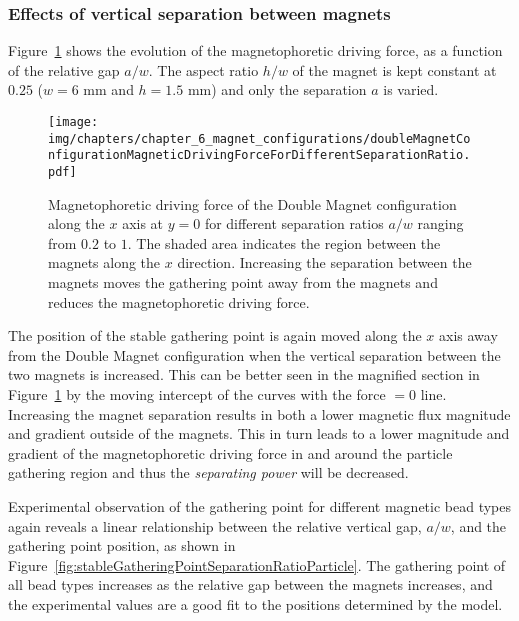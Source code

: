 \subsubsection{Effects of vertical separation between magnets}\label{subsubsec:effectsOfVerticalSeparationBetweenMagnets}
Figure~\ref{fig:doubleMagnetConfigurationMagneticDrivingForceAndFluxDensityForDifferentSeparationRatio} shows the evolution of the magnetophoretic driving force, as a function of the relative gap $a/w$. The aspect ratio $h/w$ of the magnet is kept constant at $0.25$ ($w=6$ mm and $h=1.5$ mm) and only the separation $a$ is varied.

\begin{figure}[htb]
	\centering
	\texttt{[image: img/chapters/chapter\_6\_magnet\_configurations/doubleMagnetConfigurationMagneticDrivingForceForDifferentSeparationRatio.pdf]}
\caption[Magnetophoretic driving force of the Double Magnet configuration for different separation ratio]{Magnetophoretic driving force of the Double Magnet configuration along the $x$ axis at $y=0$ for different separation ratios $a/w$ ranging from $0.2$ to $1$. The shaded area indicates the region between the magnets along the $x$ direction. Increasing the separation between the magnets moves the gathering point away from the magnets and reduces the magnetophoretic driving force.}
\label{fig:doubleMagnetConfigurationMagneticDrivingForceAndFluxDensityForDifferentSeparationRatio}
\end{figure}

The position of the stable gathering point is again moved along the $x$ axis away from the Double Magnet configuration when the vertical separation between the two magnets is increased. This can be better seen in the magnified section in Figure~\ref{fig:doubleMagnetConfigurationMagneticDrivingForceAndFluxDensityForDifferentSeparationRatio} by the moving intercept of the curves with the force $=0$ line. Increasing the magnet separation results in both a lower magnetic flux magnitude and gradient outside of the magnets. This in turn leads to a lower magnitude and gradient of the magnetophoretic driving force in and around the particle gathering region and thus the \textit{separating power} will be decreased.

Experimental observation of the gathering point for different magnetic bead types again reveals a linear relationship between the relative vertical gap, $a/w$, and the gathering point position, as shown in Figure~\ref{fig:stableGatheringPointSeparationRatioParticle}. The gathering point of all bead types increases as the relative gap between the magnets increases, and the experimental values are a good fit to the positions determined by the model. 

